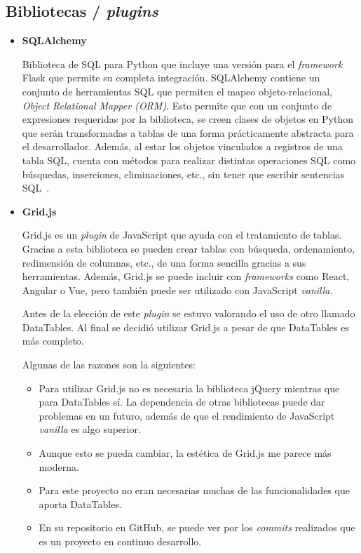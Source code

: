 \subsection{Bibliotecas / \textit{plugins}}
\begin{itemize}
\item\textbf{SQLAlchemy}

Biblioteca de SQL para Python que incluye una versión para el \textit{framework} Flask que permite su completa integración. 
SQLAlchemy contiene un conjunto de herramientas SQL que permiten el mapeo objeto-relacional, \textit{Object Relational Mapper (ORM)}. 
Esto permite que con un conjunto de expresiones requeridas por la biblioteca, se creen clases de objetos en Python que serán transformadas a tablas de una forma prácticamente abstracta para el desarrollador. 
Además, al estar los objetos vinculados a registros de una tabla SQL, cuenta con métodos para realizar distintas operaciones SQL como búsquedas, inserciones, eliminaciones, etc., sin tener que escribir sentencias SQL~\cite{sqlAlchemy}.

\item\textbf{Grid.js}

Grid.js es un \textit{plugin} de JavaScript que ayuda con el tratamiento de tablas. 
Gracias a esta biblioteca se pueden crear tablas con búsqueda, ordenamiento, redimensión de columnas, etc., de una forma sencilla gracias a sus herramientas. 
Además, Grid.js se puede incluir con \textit{frameworks} como React, Angular o Vue, pero también puede ser utilizado con JavaScript \textit{vanilla}.


Antes de la elección de este \textit{plugin} se estuvo valorando el uso de otro llamado DataTables. Al final se decidió utilizar Grid.js a pesar de que DataTables es más completo.

Algunas de las razones son la siguientes:
\begin{itemize}
\item Para utilizar Grid.js no es necesaria la biblioteca jQuery mientras que para DataTables sí. La dependencia de otras bibliotecas puede dar problemas en un futuro, además de que el rendimiento de JavaScript \textit{vanilla} es algo superior.
\item Aunque esto se pueda cambiar, la estética de Grid.js me parece más moderna.
\item Para este proyecto no eran necesarias muchas de las funcionalidades que aporta DataTables.
\item En su repositorio en GitHub, se puede ver por los \textit{commits} realizados que es un proyecto en continuo desarrollo.
\end{itemize}


\end{itemize}
